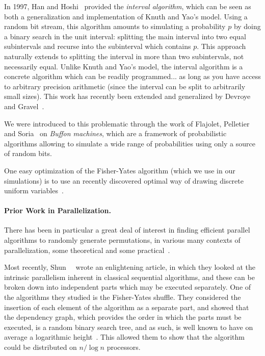 \documentclass[letter,11pt,en]{quick-document}
\begin{document}
In 1997, Han and Hoshi~\cite{HaHo97} provided the \emph{interval
  algorithm}, which can be seen as both a generalization and
implementation of Knuth and Yao's model. Using a random bit stream, this
algorithm amounts to simulating a probability $p$ by doing a binary search
in the unit interval: splitting the main interval into two equal
subintervals and recurse into the subinterval which contains $p$. This
approach naturally extends to splitting the interval in more than two
subintervals, not necessarily equal. Unlike Knuth and Yao's model, the
interval algorithm is a concrete algorithm which can be readily
programmed... as long as you have access to arbitrary precision arithmetic
(since the interval can be split to arbitrarily small sizes). This work
has recently been extended and generalized by Devroye and
Gravel~\cite{DeGr15}.

We were introduced to this problematic through the work of Flajolet,
Pelletier and Soria~\cite{FlPeSo11} on \emph{Buffon machines}, which are a
framework of probabilistic algorithms allowing to simulate a wide range of
probabilities using only a source of random bits.

One easy optimization of the Fisher-Yates algorithm (which we use in our
simulations) is to use an recently discovered optimal way of drawing
discrete uniform variables~\cite{Lumbroso13}.

\paragraph{Prior Work in Parallelization.}

There has been in particular a great deal of interest in finding efficient
parallel algorithms to randomly generate permutations, in various many
contexts of parallelization, some theoretical and some
practical~\cite{Gustedt03, Gustedt08, Sanders98, Hagerup91, Alonso96,
  CoBa06, CzKaKuLo98, Anderson90}.

Most recently, Shun~\etal~\cite{ShGuBlFiGi15} wrote an enlightening
article, in which they looked at the intrinsic parallelism inherent in
classical sequential algorithms, and these can be broken down into
independent parts which may be executed separately. One of the algorithms
they studied is the Fisher-Yates shuffle. They considered the insertion of
each element of the algorithm as a separate part, and showed that the
dependency graph, which provides the order in which the parts must be
executed, is a random binary search tree, and as such, is well known to
have on average a logarithmic height~\cite{Devroye86}. This allowed them
to show that the algorithm could be distributed on $n/\log n$ processors.
\end{document}

